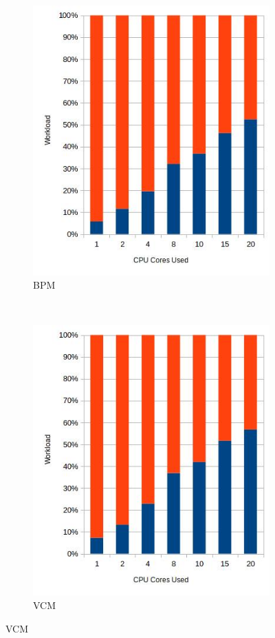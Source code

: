 \begin{figure}[H]
\begin{subfigure}[h]{0.45\textwidth}
\includegraphics[width=\textwidth]{img/bpmwl.jpg}
\caption{\label{img:bpmwl} BPM}
\end{subfigure}
~
\begin{subfigure}[h]{0.45\textwidth}
\includegraphics[width=\textwidth]{img/vcmwl.jpg}
\caption{\label{img:vcmwl} VCM}
\end{subfigure}



\end{figure}

